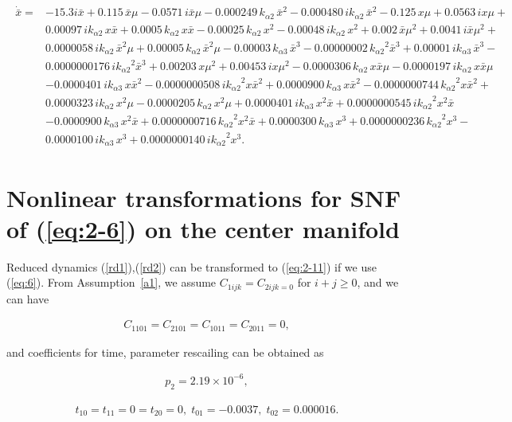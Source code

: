 \documentclass[openacc]{rsproca_new}%
\newcommand{\Eref}[1]{(\ref{#1})}
\newcommand{\asref}[1]{Assumption~\ref{#1}}
\begin{document}
\begin{appendices}
\begin{align}\label{rd2}
\begin{split}
\dot {\bar x}=&- 15.3 i  \bar x+ 0.115\,\bar x\mu- 0.0571\,i\bar x\mu- 0.000249\,{   k_{\alpha 2}}\,{\bar x}^{2}- 0.000480\,i{   k_{\alpha 2}}\,{\bar x}^{2}- 0.125\,x\mu+
0.0563\,ix\mu+\\& 0.00097\,i{   k_{\alpha 2}}\,x\bar x+ 0.0005\,{   k_{\alpha 2}}\,x\bar x-
0.00025\,{   k_{\alpha 2}}\,{x}^{2}- 0.00048\,i{   k_{\alpha 2}}\,{x}^{2}+ 0.002
\,\bar x{\mu}^{2}+ 0.0041\,i\bar x{\mu}^{2}+ \\&0.0000058\,i{   k_{\alpha 2}}\,{\bar x}^{2}\mu
+ 0.00005\,{   k_{\alpha 2}}\,{\bar x}^{2}\mu- 0.00003\,{   k_{\alpha 3}}\,{\bar x}^{3}-
0.00000002\,{{   k_{\alpha 2}}}^{2}{\bar x}^{3}+ 0.00001\,i{   k_{\alpha 3}}\,{\bar x}^{3}-\\&
0.0000000176\,i{{   k_{\alpha 2}}}^{2}{\bar x}^{3}+ 0.00203\,x{\mu}^{2}+ 0.00453\,
ix{\mu}^{2}- 0.0000306\,{   k_{\alpha 2}}\,x\bar x\mu- 0.0000197\,i{   k_{\alpha 2}}\,x\bar x\mu
\\&- 0.0000401\,i{   k_{\alpha 3}}\,x{\bar x}^{2}- 0.0000000508\,i{{   k_{\alpha 2}}}^{2}x{\bar x}^
{2}+ 0.0000900\,{   k_{\alpha 3}}\,x{\bar x}^{2}- 0.0000000744\,{{   k_{\alpha 2}}}^{2}x{\bar x}
^{2}+ \\&0.0000323\,i{   k_{\alpha 2}}\,{x}^{2}\mu- 0.0000205\,{   k_{\alpha 2}}\,{x}^{2}
\mu+ 0.0000401\,i{   k_{\alpha 3}}\,{x}^{2}\bar x+ 0.0000000545\,i{{   k_{\alpha 2}}}^{2}{x
}^{2}\bar x\\&- 0.0000900\,{   k_{\alpha 3}}\,{x}^{2}\bar x+ 0.0000000716\,{{   k_{\alpha 2}}}^{2}{
x}^{2}\bar x+ 0.0000300\,{   k_{\alpha 3}}\,{x}^{3}+ 0.0000000236\,{{   k_{\alpha 2}}}^{2}{
x}^{3}- \\&0.0000100\,i{   k_{\alpha 3}}\,{x}^{3}+ 0.0000000140\,i{{   k_{\alpha 2}}}^{2}
{x}^{3}.
\end{split}
\end{align}

\section{Nonlinear transformations for SNF of  \Eref{eq:2-6} on the center manifold} \label{ap2}

Reduced dynamics \Eref{rd1},\Eref{rd2} can be transformed to \Eref{eq:2-11} if we use \Eref{eq:6}. From \asref{a1}, we assume $C_{1ijk}=C_{2ijk=0}$ for $i+j \geq 0$, and we can have

\begin{align}
C_{1101}=C_{2101}=C_{1011}=C_{2011}=0,
\end{align}

\noindent and coefficients for time, parameter rescailing can be obtained as

\begin{align}
p_2=2.19\times10^{-6},
\end{align}

\begin{align}
t_{10}=t_{11}=0=t_{20}=0,\;t_{01}=-0.0037, \; t_{02}=0.000016.
\end{align}

\end{appendices}






\end{document}

